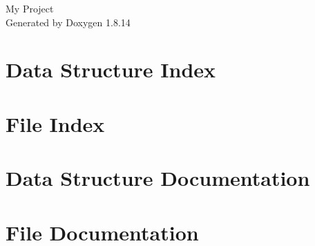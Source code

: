 \documentclass[twoside]{book}
\newcommand{\+}{\discretionary{\mbox{\scriptsize$\hookleftarrow$}}{}{}}
\newcommand{\clearemptydoublepage}{%
  \newpage{\pagestyle{empty}\cleardoublepage}%
}
\begin{document}
\hypersetup{pageanchor=false,
             bookmarksnumbered=true,
             pdfencoding=unicode
            }
\begin{titlepage}
\vspace*{7cm}
\begin{center}%
{\Large My Project }\\
\vspace*{1cm}
{\large Generated by Doxygen 1.8.14}\\
\end{center}
\end{titlepage}
\clearemptydoublepage
{}
\tableofcontents
\clearemptydoublepage
{}
\hypersetup{pageanchor=true}

\chapter{Data Structure Index}

\chapter{File Index}

\chapter{Data Structure Documentation}








\chapter{File Documentation}

































\backmatter
\newpage
{}
\clearemptydoublepage
{}
\printindex
\end{document}
